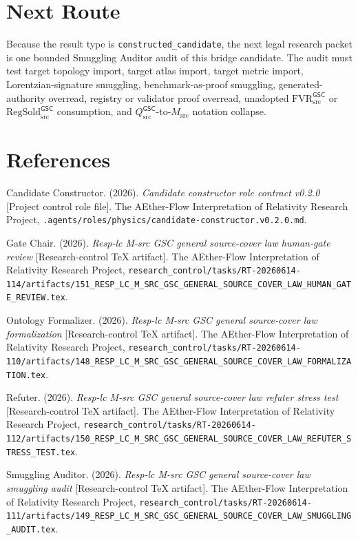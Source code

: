 \documentclass[11pt]{article}
\newcommand{\GSC}{\mathsf{GSC}}
\newcommand{\Msrc}{M_{\mathrm{src}}}
\newcommand{\Qsrc}{Q_{\mathrm{src}}}
\begin{document}
\section{Next Route}

Because the result type is \texttt{constructed\_candidate}, the next legal
research packet is one bounded Smuggling Auditor audit of this bridge candidate.
The audit must test target topology import, target atlas import, target metric
import, Lorentzian-signature smuggling, benchmark-as-proof smuggling,
generated-authority overread, registry or validator proof overread, unadopted
\(\mathrm{FVR}_{\mathrm{src}}^{\GSC}\) or
\(\mathrm{RegSold}_{\mathrm{src}}^{\GSC}\) consumption, and
\(\Qsrc^{\GSC}\)-to-\(\Msrc\) notation collapse.

\section*{References}

Candidate Constructor. (2026). \textit{Candidate constructor role contract
v0.2.0} [Project control role file]. The AEther-Flow Interpretation of
Relativity Research Project, \texttt{.agents/roles/physics/candidate-constructor.v0.2.0.md}.

Gate Chair. (2026). \textit{Resp-lc M-src GSC general source-cover law
human-gate review} [Research-control TeX artifact]. The AEther-Flow
Interpretation of Relativity Research Project,
\texttt{research\_control/tasks/RT-20260614-114/artifacts/151\_RESP\_LC\_M\_SRC\_GSC\_GENERAL\_SOURCE\_COVER\_LAW\_HUMAN\_GATE\_REVIEW.tex}.

Ontology Formalizer. (2026). \textit{Resp-lc M-src GSC general source-cover
law formalization} [Research-control TeX artifact]. The AEther-Flow
Interpretation of Relativity Research Project,
\texttt{research\_control/tasks/RT-20260614-110/artifacts/148\_RESP\_LC\_M\_SRC\_GSC\_GENERAL\_SOURCE\_COVER\_LAW\_FORMALIZATION.tex}.

Refuter. (2026). \textit{Resp-lc M-src GSC general source-cover law refuter
stress test} [Research-control TeX artifact]. The AEther-Flow Interpretation
of Relativity Research Project,
\texttt{research\_control/tasks/RT-20260614-112/artifacts/150\_RESP\_LC\_M\_SRC\_GSC\_GENERAL\_SOURCE\_COVER\_LAW\_REFUTER\_STRESS\_TEST.tex}.

Smuggling Auditor. (2026). \textit{Resp-lc M-src GSC general source-cover law
smuggling audit} [Research-control TeX artifact]. The AEther-Flow
Interpretation of Relativity Research Project,
\texttt{research\_control/tasks/RT-20260614-111/artifacts/149\_RESP\_LC\_M\_SRC\_GSC\_GENERAL\_SOURCE\_COVER\_LAW\_SMUGGLING\_AUDIT.tex}.
\end{document}
